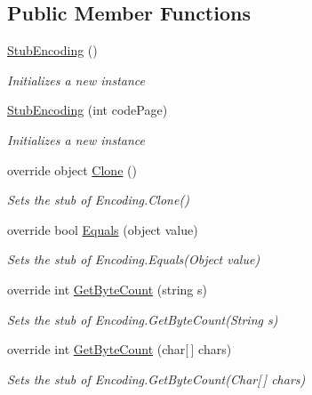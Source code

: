 \subsection*{Public Member Functions}
\begin{DoxyCompactItemize}
\item 
\hyperlink{class_system_1_1_text_1_1_fakes_1_1_stub_encoding_a5a8395b30258e3ee1ea9f63acdf2b98b}{Stub\-Encoding} ()
\begin{DoxyCompactList}\small\item\em Initializes a new instance\end{DoxyCompactList}\item 
\hyperlink{class_system_1_1_text_1_1_fakes_1_1_stub_encoding_ae71ab07dfd592270bfb1f3bca1622292}{Stub\-Encoding} (int code\-Page)
\begin{DoxyCompactList}\small\item\em Initializes a new instance\end{DoxyCompactList}\item 
override object \hyperlink{class_system_1_1_text_1_1_fakes_1_1_stub_encoding_ac9cb6b00f88e6b5c248cd90c7df003e6}{Clone} ()
\begin{DoxyCompactList}\small\item\em Sets the stub of Encoding.\-Clone()\end{DoxyCompactList}\item 
override bool \hyperlink{class_system_1_1_text_1_1_fakes_1_1_stub_encoding_aefec98d5348f1146a0a236fe9e63c8fd}{Equals} (object value)
\begin{DoxyCompactList}\small\item\em Sets the stub of Encoding.\-Equals(\-Object value)\end{DoxyCompactList}\item 
override int \hyperlink{class_system_1_1_text_1_1_fakes_1_1_stub_encoding_a2d38f91c43e1b9815dbe4bb525b0ed53}{Get\-Byte\-Count} (string s)
\begin{DoxyCompactList}\small\item\em Sets the stub of Encoding.\-Get\-Byte\-Count(\-String s)\end{DoxyCompactList}\item 
override int \hyperlink{class_system_1_1_text_1_1_fakes_1_1_stub_encoding_a34b1bc7cb2b22ed7bd6f01a3ed03c219}{Get\-Byte\-Count} (char\mbox{[}$\,$\mbox{]} chars)
\begin{DoxyCompactList}\small\item\em Sets the stub of Encoding.\-Get\-Byte\-Count(\-Char\mbox{[}$\,$\mbox{]} chars)\end{DoxyCompactList}\item 

\end{DoxyCompactItemize}

